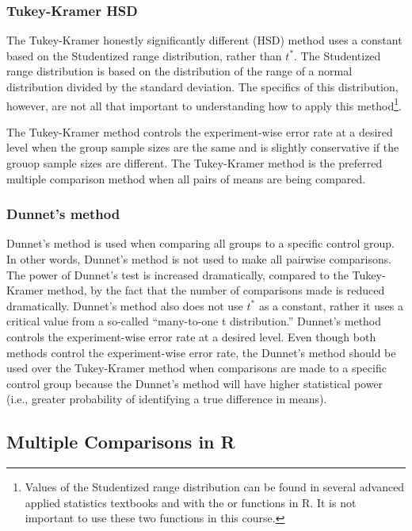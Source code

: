 \documentclass[10pt,openany]{book}\usepackage[]{graphicx}\usepackage[]{color}
\begin{document}
\subsubsection{Tukey-Kramer HSD}
The Tukey-Kramer honestly significantly different (HSD) method uses a constant based on the Studentized range distribution, rather than $t^{*}$.  The Studentized range distribution is based on the distribution of the range of a normal distribution divided by the standard deviation.  The specifics of this distribution, however, are not all that important to understanding how to apply this method\footnote{Values of the Studentized range distribution can be found in several advanced applied statistics textbooks and with the  or  functions in R.  It is not important to use these two functions in this course.}.

The Tukey-Kramer method controls the experiment-wise error rate at a desired level when the group sample sizes are the same and is slightly conservative if the grouop sample sizes are different.  The Tukey-Kramer method is the preferred multiple comparison method when all pairs of means are being compared.


\subsubsection{Dunnet's method}
Dunnet's method is used when comparing all groups to a specific control group.  In other words, Dunnet's method is not used to make all pairwise comparisons.  The power of Dunnet's test is increased dramatically, compared to the Tukey-Kramer method, by the fact that the number of comparisons made is reduced dramatically.  Dunnet's method also does not use $t^{*}$ as a constant, rather it uses a critical value from a so-called ``many-to-one t distribution.''  Dunnet's method controls the experiment-wise error rate at a desired level.  Even though both methods control the experiment-wise error rate, the Dunnet's method should be used over the Tukey-Kramer method when comparisons are made to a specific control group because the Dunnet's method will have higher statistical power (i.e., greater probability of identifying a true difference in means).


\subsection{Multiple Comparisons in R}
\end{document}
